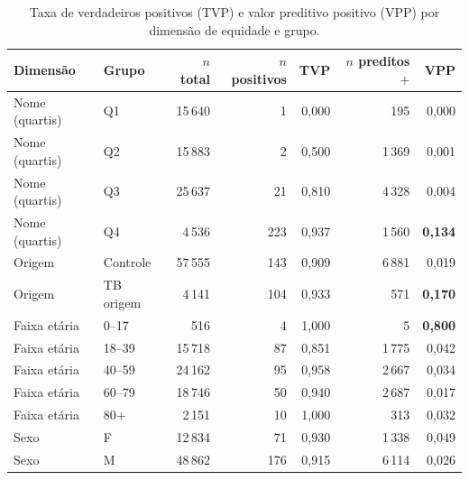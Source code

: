 \begin{table}[htbp]
\centering
\caption{Taxa de verdadeiros positivos (TVP) e valor preditivo positivo (VPP) por dimens\~ao de equidade e grupo.}
\label{tab:qw3-group-metrics-corte6}
\small
\begin{tabular}{llrrrrr}
\toprule
Dimens\~ao & Grupo & $n$ total & $n$ positivos & TVP & $n$ preditos$+$ & VPP \\
\midrule
Nome (quartis) & Q1 & 15\,640 & 1   & 0{,}000 & 195   & 0{,}000 \\
Nome (quartis) & Q2 & 15\,883 & 2   & 0{,}500 & 1\,369 & 0{,}001 \\
Nome (quartis) & Q3 & 25\,637 & 21  & 0{,}810 & 4\,328 & 0{,}004 \\
Nome (quartis) & Q4 & 4\,536  & 223 & 0{,}937 & 1\,560 & \textbf{0{,}134} \\
\midrule
Origem & Controle  & 57\,555 & 143 & 0{,}909 & 6\,881 & 0{,}019 \\
Origem & TB origem & 4\,141  & 104 & 0{,}933 & 571   & \textbf{0{,}170} \\
\midrule
Faixa et\'aria & 0--17  & 516    & 4   & 1{,}000 & 5     & \textbf{0{,}800} \\
Faixa et\'aria & 18--39 & 15\,718 & 87  & 0{,}851 & 1\,775 & 0{,}042 \\
Faixa et\'aria & 40--59 & 24\,162 & 95  & 0{,}958 & 2\,667 & 0{,}034 \\
Faixa et\'aria & 60--79 & 18\,746 & 50  & 0{,}940 & 2\,687 & 0{,}017 \\
Faixa et\'aria & 80+    & 2\,151  & 10  & 1{,}000 & 313   & 0{,}032 \\
\midrule
Sexo & F & 12\,834 & 71  & 0{,}930 & 1\,338 & 0{,}049 \\
Sexo & M & 48\,862 & 176 & 0{,}915 & 6\,114 & 0{,}026 \\
\bottomrule
\end{tabular}
\end{table}
